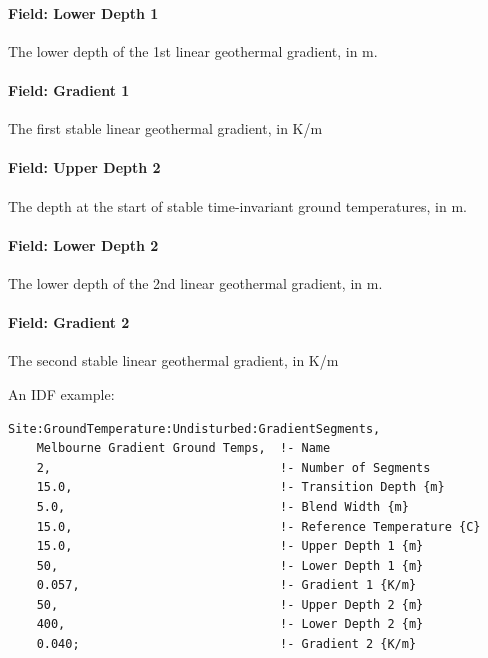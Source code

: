 \paragraph{Field: Lower Depth 1}\label{field-lower-depth-1}

The lower depth of the 1st linear geothermal gradient, in m.

\paragraph{Field: Gradient 1}\label{field-gradient-1}

The first stable linear geothermal gradient, in K/m

\paragraph{Field: Upper Depth 2}\label{field-upper-depth-2}

The depth at the start of stable time-invariant ground temperatures, in m.

\paragraph{Field: Lower Depth 2}\label{field-lower-depth-2}

The lower depth of the 2nd linear geothermal gradient, in m.

\paragraph{Field: Gradient 2}\label{field-gradient-2}

The second stable linear geothermal gradient, in K/m

An IDF example:

\begin{lstlisting}
Site:GroundTemperature:Undisturbed:GradientSegments,
    Melbourne Gradient Ground Temps,  !- Name
    2,                                !- Number of Segments
    15.0,                             !- Transition Depth {m}
    5.0,                              !- Blend Width {m}
    15.0,                             !- Reference Temperature {C}
    15.0,                             !- Upper Depth 1 {m}
    50,                               !- Lower Depth 1 {m}
    0.057,                            !- Gradient 1 {K/m}
    50,                               !- Upper Depth 2 {m}
    400,                              !- Lower Depth 2 {m}
    0.040;                            !- Gradient 2 {K/m}
\end{lstlisting}


